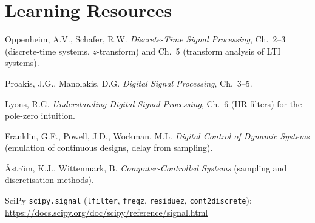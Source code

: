 \documentclass[11pt,a4paper]{article}
\begin{document}
\section*{Learning Resources}
\begin{resources}
  \item Oppenheim, A.V., Schafer, R.W. \emph{Discrete-Time Signal Processing}, Ch.~2--3 (discrete-time systems, $z$-transform) and Ch.~5 (transform analysis of LTI systems).
  \item Proakis, J.G., Manolakis, D.G. \emph{Digital Signal Processing}, Ch.~3--5.
  \item Lyons, R.G. \emph{Understanding Digital Signal Processing}, Ch.~6 (IIR filters) for the pole-zero intuition.
\end{resources}
\begin{resources}
  \item Franklin, G.F., Powell, J.D., Workman, M.L. \emph{Digital Control of Dynamic Systems} (emulation of continuous designs, delay from sampling).
  \item \r{A}str\"om, K.J., Wittenmark, B. \emph{Computer-Controlled Systems} (sampling and discretisation methods).
\end{resources}
\begin{resources}
  \item SciPy \texttt{scipy.signal} (\texttt{lfilter}, \texttt{freqz}, \texttt{residuez}, \texttt{cont2discrete}): \url{https://docs.scipy.org/doc/scipy/reference/signal.html}
\end{resources}

\evaluation
\end{document}

